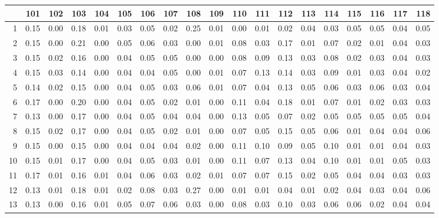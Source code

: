 \documentclass[a4paper]{article}
\begin{document}
\begin{sidewaystable}[h!]
\centering
{\small
\begin{tabular}{rrrrrrrrrrrrrrrrrrr}
  \hline
 & 101 & 102 & 103 & 104 & 105 & 106 & 107 & 108 & 109 & 110 & 111 & 112 & 113 & 114 & 115 & 116 & 117 & 118 \\ 
  \hline
1 & 0.15 & 0.00 & 0.18 & 0.01 & 0.03 & 0.05 & 0.02 & 0.25 & 0.01 & 0.00 & 0.01 & 0.02 & 0.04 & 0.03 & 0.05 & 0.05 & 0.04 & 0.05 \\ 
  2 & 0.15 & 0.00 & 0.21 & 0.00 & 0.05 & 0.06 & 0.03 & 0.00 & 0.01 & 0.08 & 0.03 & 0.17 & 0.01 & 0.07 & 0.02 & 0.01 & 0.04 & 0.03 \\ 
  3 & 0.15 & 0.02 & 0.16 & 0.00 & 0.04 & 0.05 & 0.05 & 0.00 & 0.00 & 0.08 & 0.09 & 0.13 & 0.03 & 0.08 & 0.02 & 0.03 & 0.04 & 0.03 \\ 
  4 & 0.15 & 0.03 & 0.14 & 0.00 & 0.04 & 0.04 & 0.05 & 0.00 & 0.01 & 0.07 & 0.13 & 0.14 & 0.03 & 0.09 & 0.01 & 0.03 & 0.04 & 0.02 \\ 
  5 & 0.14 & 0.02 & 0.15 & 0.00 & 0.04 & 0.05 & 0.03 & 0.06 & 0.01 & 0.07 & 0.04 & 0.13 & 0.05 & 0.06 & 0.03 & 0.06 & 0.03 & 0.04 \\ 
  6 & 0.17 & 0.00 & 0.20 & 0.00 & 0.04 & 0.05 & 0.02 & 0.01 & 0.00 & 0.11 & 0.04 & 0.18 & 0.01 & 0.07 & 0.01 & 0.02 & 0.03 & 0.03 \\ 
  7 & 0.13 & 0.00 & 0.17 & 0.00 & 0.04 & 0.05 & 0.04 & 0.04 & 0.00 & 0.13 & 0.05 & 0.07 & 0.02 & 0.05 & 0.05 & 0.05 & 0.05 & 0.04 \\ 
  8 & 0.15 & 0.02 & 0.17 & 0.00 & 0.04 & 0.05 & 0.02 & 0.01 & 0.00 & 0.07 & 0.05 & 0.15 & 0.05 & 0.06 & 0.01 & 0.04 & 0.04 & 0.06 \\ 
  9 & 0.15 & 0.00 & 0.15 & 0.00 & 0.04 & 0.04 & 0.04 & 0.02 & 0.00 & 0.11 & 0.10 & 0.09 & 0.05 & 0.10 & 0.01 & 0.01 & 0.04 & 0.03 \\ 
  10 & 0.15 & 0.01 & 0.17 & 0.00 & 0.04 & 0.05 & 0.03 & 0.01 & 0.00 & 0.11 & 0.07 & 0.13 & 0.04 & 0.10 & 0.01 & 0.01 & 0.05 & 0.03 \\ 
  11 & 0.17 & 0.01 & 0.16 & 0.01 & 0.04 & 0.06 & 0.03 & 0.02 & 0.01 & 0.07 & 0.07 & 0.15 & 0.02 & 0.05 & 0.04 & 0.04 & 0.03 & 0.03 \\ 
  12 & 0.13 & 0.01 & 0.18 & 0.01 & 0.02 & 0.08 & 0.03 & 0.27 & 0.00 & 0.01 & 0.01 & 0.04 & 0.01 & 0.02 & 0.04 & 0.03 & 0.04 & 0.06 \\ 
  13 & 0.13 & 0.00 & 0.16 & 0.01 & 0.05 & 0.07 & 0.06 & 0.03 & 0.00 & 0.08 & 0.03 & 0.10 & 0.03 & 0.06 & 0.06 & 0.02 & 0.04 & 0.04 \\ 

\end{tabular}}
\end{sidewaystable}
\end{document}

